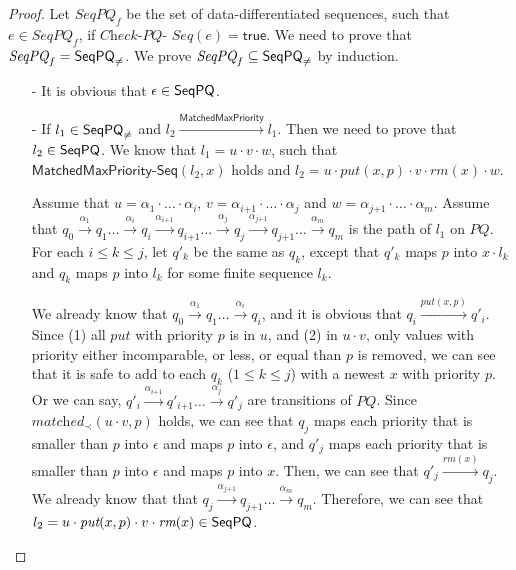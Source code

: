 \begin {proof}

Let $\textit{SeqPQ}_f$ be the set of data-differentiated sequences, such that $e \in \textit{SeqPQ}_f$, if $\textit{Check-PQ-}$ $\textit{Seq}(e)=\mathsf{true}$. We need to prove that $\textit{SeqPQ}_f = \mathsf{SeqPQ}_{\neq}$.
We prove $\textit{SeqPQ}_f \subseteq \mathsf{SeqPQ}_{\neq}$ by induction.

\begin{itemize}
\setlength{\itemsep}{0.5pt}
\item[-] It is obvious that $\epsilon \in \mathsf{SeqPQ}$.

\item[-] If $l_1 \in \mathsf{SeqPQ}_{\neq}$ and $l_2 \xrightarrow{\mathsf{MatchedMaxPriority}} l_1$. Then we need to prove that $l_2 \in \mathsf{SeqPQ}$. We know that $l_1 = u \cdot v \cdot w$, such that $\mathsf{MatchedMaxPriority\text{-}Seq}(l_2,x)$ holds and $l_2 = u \cdot \textit{put}(x,p) \cdot v \cdot \textit{rm}(x) \cdot w$.

    Assume that $u = \alpha_1 \cdot \ldots \cdot \alpha_i$, $v = \alpha_{\textit{i+1}} \cdot \ldots \cdot \alpha_j$ and $w = \alpha_{\textit{j+1}} \cdot \ldots \cdot \alpha_m$. Assume that $q_0 \xrightarrow{\alpha_1} q_1 \ldots \xrightarrow{\alpha_i} q_i \xrightarrow{\alpha_{\textit{i+1}}} q_{\textit{i+1}} \ldots  \xrightarrow{\alpha_j} q_j \xrightarrow{\alpha_{\textit{j+1}}} q_{\textit{j+1}} \ldots \xrightarrow{\alpha_m} q_m$ is the path of $l_1$ on $\textit{PQ}$. For each $i \leq k \leq j$, let $q'_k$ be the same as $q_k$, except that $q'_k$ maps $p$ into $x \cdot l_k$ and $q_k$ maps $p$ into $l_k$ for some finite sequence $l_k$.

    We already know that $q_0 \xrightarrow{\alpha_1} q_1 \ldots \xrightarrow{\alpha_i} q_i$, and it is obvious that $q_i \xrightarrow{\textit{put}(x,p)} q'_i$. Since (1) all $\textit{put}$ with priority $p$ is in $u$, and (2) in $u \cdot v$, only values with priority either incomparable, or less, or equal than $p$ is removed, we can see that it is safe to add to each $q_k$ ($1 \leq k \leq j$) with a newest $x$ with priority $p$. Or we can say, $q'_i \xrightarrow{\alpha_{\textit{i+1}}} q'_{\textit{i+1}} \ldots \xrightarrow{\alpha_j} q'_j$ are transitions of $\textit{PQ}$. Since $\textit{matched}_{\prec}(u \cdot v,p)$ holds, we can see that $q_j$ maps each priority that is smaller than $p$ into $\epsilon$ and maps $p$ into $\epsilon$, and $q'_j$ maps each priority that is smaller than $p$ into $\epsilon$ and maps $p$ into $x$. Then, we can see that $q'_j \xrightarrow{\textit{rm}(x)} q_j$. We already know that that $q_j \xrightarrow{\alpha_{\textit{j+1}}} q_{\textit{j+1}} \ldots \xrightarrow{\alpha_m} q_m$. Therefore, we can see that $l_2 = u \cdot \textit{put}(x,p) \cdot v \cdot \textit{rm}(x) \in \mathsf{SeqPQ}$.


\end{itemize}
\end{proof}
